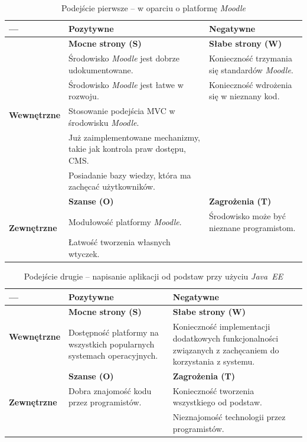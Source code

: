 \begin{table}[H]
\centering
\begin{tabular}{ | p{2.5cm} | p{5.5cm} | p{5.5cm} | }
\hline
--- & \textbf{Pozytywne} & \textbf{Negatywne} \\ \hline
\multirow{6}{*}{\textbf{Wewnętrzne}} & \textbf{Mocne strony (S)} & \textbf{Słabe strony (W)} \\
			& Środowisko \textit{Moodle} jest dobrze udokumentowane\cite{Man:Moodle}. & Konieczność trzymania się standardów \textit{Moodle}. \\
			& Środowisko \textit{Moodle} jest łatwe w rozwoju. & Konieczność wdrożenia się w nieznany kod. \\
			& Stosowanie podejścia MVC w środowisku \textit{Moodle}. & \\
			& Już zaimplementowane mechanizmy, takie jak kontrola praw dostępu, CMS. & \\
			& Posiadanie bazy wiedzy, która ma zachęcać użytkowników. & \\ \hline
%					
\multirow{3}{*}{\textbf{Zewnętrzne}} & \textbf{Szanse (O)} & \textbf{Zagrożenia (T)} \\
				& Modułowość platformy \textit{Moodle}. & Środowisko może być nieznane programistom. \\
				& Łatwość tworzenia własnych wtyczek. & \\ \hline
\end{tabular}
\caption{Podejście pierwsze -- w oparciu o platformę \textit{Moodle}}\label{tab:SWOT1}
\end{table}

\begin{table}[H]
\centering
\begin{tabular}{ | p{2.5cm} | p{5.5cm} | p{5.5cm} | }
\hline
--- & \textbf{Pozytywne} & \textbf{Negatywne} \\ \hline
\multirow{2}{*}{\textbf{Wewnętrzne}} & \textbf{Mocne strony (S)} & \textbf{Słabe strony (W)} \\
			& Dostępność platformy na wszystkich popularnych systemach operacyjnych. & Konieczność implementacji dodatkowych funkcjonalności związanych z zachęcaniem do korzystania z systemu. \\ \hline
%					
\multirow{3}{*}{\textbf{Zewnętrzne}} & \textbf{Szanse (O)} & \textbf{Zagrożenia (T)} \\
				& Dobra znajomość kodu przez programistów. & Konieczność tworzenia wszystkiego od podstaw. \\
				& & Nieznajomość technologii przez programistów. \\ \hline
\end{tabular}
\caption{Podejście drugie -- napisanie aplikacji od podstaw przy użyciu \textit{Java~EE}}\label{tab:SWOT2}
\end{table}

